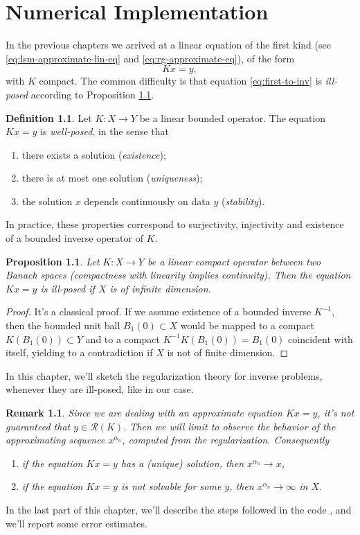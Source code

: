 \documentclass[10pt, a4paper, twoside, openright]{book}
\theoremstyle{definition}
\newtheorem{definition}[subsection]{Definition}
\theoremstyle{plain}
\theoremstyle{plain}
\theoremstyle{plain}
\newtheorem{proposition}[subsection]{Proposition}
\theoremstyle{plain}
\newtheorem{remark}[subsection]{Remark}
\theoremstyle{plain}
\theoremstyle{plain}
\theoremstyle{plain}
\theoremstyle{plain}
\begin{document}
\chapter{Numerical Implementation}
\label{ch:implementation}
In the previous chapters we arrived at a linear equation of the first kind (see \eqref{eq:lsm-approximate-lin-eq} and \eqref{eq:rg-approximate-eq}), of the form
\begin{equation}
 Kx = y,\label{eq:first-to-inv}
\end{equation}
with $K$ compact. The common difficulty is that equation \eqref{eq:first-to-inv} is \emph{ill-posed} according to Proposition \ref{prop:ill-posed}.
\begin{definition}
 Let $K:X\to Y$ be a linear bounded operator. The equation $Kx=y$ is \emph{well-posed}, in the sense that
 \begin{enumerate}
  \item there exists a solution (\emph{existence});
  \item there is at most one solution (\emph{uniqueness});
  \item the solution $x$ depends continuously on data $y$ (\emph{stability}).
 \end{enumerate}
In practice, these properties correspond to surjectivity, injectivity and existence 
of a bounded inverse operator of $K$.
\end{definition}
\begin{proposition}
\label{prop:ill-posed}
 Let $K:X\to Y$ be a linear compact operator between two Banach spaces (compactness with linearity implies continuity). Then 
 the equation $Kx=y$ is ill-posed if $X$ is of infinite dimension.
\end{proposition}
\begin{proof}
 It's a classical proof. If we assume existence of a bounded inverse $K^{-1}$, then the bounded unit ball $B_1(0)\subset X$ would be mapped to 
 a compact $K(B_1(0))\subset Y$ and to a compact $K^{-1}K(B_1(0))=B_1(0)$ coincident with itself, yielding to a contradiction if $X$ is not of finite dimension.
\end{proof}
In this chapter, we'll sketch the regularization theory for inverse problems, whenever they are ill-posed, like in our case.
\begin{remark}
 Since we are dealing with an approximate equation $Kx=y$, it's not guaranteed that $y\in \mathcal{R}(K)$. 
 Then we will limit to observe the behavior of the approximating sequence $x^{\alpha_n}$, computed from the regularization.
 Consequently
 \begin{enumerate}
  \item if the equation $Kx=y$ has a (unique) solution, then $x^{\alpha_n}\to x$,
  \item if the equation $Kx=y$ is not solvable for some $y$, then $x^{\alpha_n}\to \infty$ in $X$.
 \end{enumerate}
\end{remark}
In the last part of this chapter, we'll describe the steps followed in the code \cite{}, and we'll report some error estimates.
\end{document}
